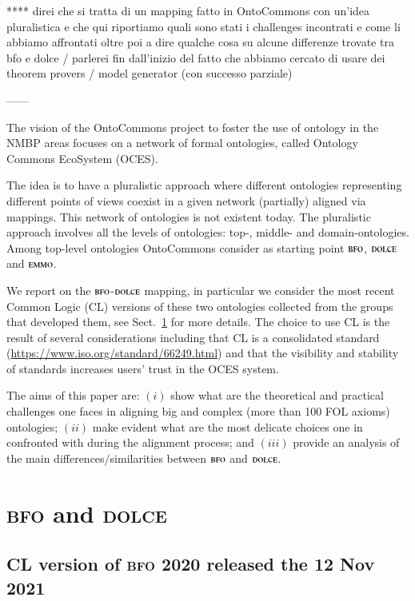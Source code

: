 \documentclass[ao]{iosart2x}
\newcommand{\dolce}{{\textsc{dolce}}}
\newcommand{\bfo}{{\textsc{bfo}}}
\newcommand{\emmo}{{\textsc{emmo}}}
\begin{document}
{\color{red} **** direi che si tratta di un mapping fatto in OntoCommons con un'idea pluralistica e che qui riportiamo quali sono stati i challenges incontrati e come li abbiamo affrontati oltre poi a dire qualche cosa su alcune differenze trovate tra bfo e dolce / parlerei fin dall'inizio del fatto che abbiamo cercato di usare dei theorem provers / model generator (con successo parziale)}

------

The vision of the OntoCommons project to foster the use of ontology in the NMBP areas focuses on a network of formal ontologies, called Ontology Commons EcoSystem (OCES). 

The idea is to have a pluralistic approach where different ontologies representing different points of views coexist in a given network (partially) aligned via mappings. This network of ontologies is not existent today. The pluralistic approach involves all the levels of ontologies: top-, middle- and domain-ontologies. Among top-level ontologies OntoCommons consider as starting point $\bfo$, $\dolce$ and $\emmo$.

We report on the $\bfo$-$\dolce$ mapping, in particular we consider the most recent Common Logic (CL) versions of these two ontologies collected from the groups that developed them, see Sect.~\ref{sect_bfo_and_dolce} for more details. The choice to use CL is the result of several considerations including 
that CL is a consolidated standard (\url{https://www.iso.org/standard/66249.html}) and that the visibility and stability of standards increases users' trust in the OCES system.

The aims of this paper are:  $(i)$ show what are the theoretical and practical challenges one faces in aligning big and complex (more than 100 FOL axioms) ontologies; $(ii)$ make evident what are the most delicate choices one in confronted with during the alignment process;  and $(iii)$ provide an analysis of the main differences/similarities between $\bfo$ and $\dolce$.



\section{{\bfo} and {\dolce}}\label{sect_bfo_and_dolce}

\subsection{CL version of {\bfo} 2020 released the 12 Nov 2021}\label{sect_bfo}
\end{document}
